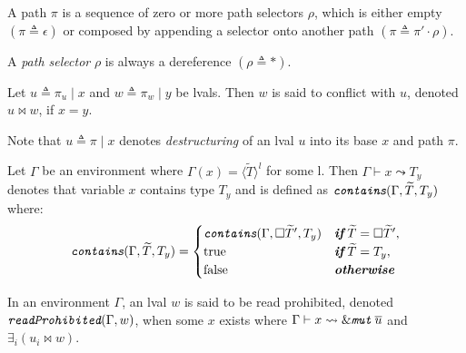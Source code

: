 \begin{subappendices}
\begin{mathpar}

\end{mathpar}
\begin{definition}[Path] A path $\pi$ is a sequence of zero or more path selectors $\rho$, which is either empty $(\pi \triangleq \epsilon)$ or composed by appending a selector onto another path $(\pi \triangleq \pi' \cdot \rho)$.
\end{definition}
\begin{definition} A \textit{path selector} $\rho$ is always a dereference $(\rho \triangleq \ast)$.
\end{definition}
\begin{definition} Let $u \triangleq \pi_{u} \mid x$ and $w \triangleq \pi_{w} \mid y$ be lvals. Then $w$ is said to conflict with $u$, denoted $u\bowtie w$, if $x = y$.
\end{definition}
\noindent Note that $u \triangleq \pi \mid x$ denotes \textit{destructuring} of an lval $u$ into its base $x$ and path $\pi$.
\begin{definition} Let $\Gamma$ be an environment where $\Gamma(x) = \langle \widetilde{T} \rangle^l$ for some l. Then $\Gamma \vdash x \leadsto T_y$ denotes that variable $x$ contains type $T_y$ and is defined as $\emph{\texttt{contains}}(\Gamma, \widetilde{T}, T_y)$ where:
\[
\emph{\texttt{contains}}(\Gamma, \widetilde{T}, T_y) = 
\begin{cases}
\emph{\texttt{contains}}(\Gamma, \square \widetilde{T}', T_y) & \emph{\textbf{if}}\;\widetilde{T} = \square \widetilde{T}', \\
\text{true} & \emph{\textbf{if}}\;\widetilde{T} = T_y, \\
\text{false} & \emph{\textbf{otherwise}}
\end{cases}
\]
\end{definition}
\begin{definition} In an environment $\Gamma$, an lval $w$ is said to be read prohibited, denoted $\emph{\texttt{readProhibited}}(\Gamma, w)$, when some $x$ exists where $\Gamma \vdash x \leadsto \&\emph{\texttt{mut}}\; \overline{u}$ and $\exists_i (u_i \bowtie w)$.    

\end{definition}
\end{subappendices}
